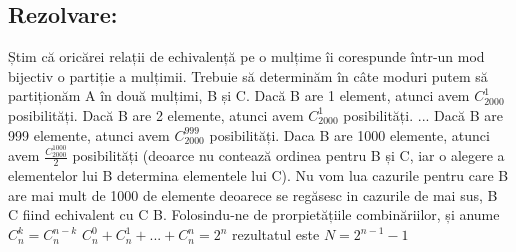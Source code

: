\documentclass{article}
\begin{document}
\subsection{Rezolvare:}
Știm că oricărei relații de echivalență pe o mulțime îi corespunde într-un mod bijectiv o partiție a mulțimii. Trebuie să determinăm în câte moduri putem să partiționăm A în două mulțimi, B și C.
\newline 
Dacă B are 1 element, atunci avem $C^1_{2000}$ posibilități.
\newline
Dacă B are 2 elemente, atunci avem $C^1_{2000}$ posibilități.
\newline
...
\newline
Dacă B are 999 elemente, atunci avem $C^{999}_{2000}$ posibilități.
\newline
Daca B are 1000 elemente, atunci avem $\frac{C^{1000}_{2000}}{2}$ posibilități (deoarce nu contează ordinea pentru B și C, iar o alegere a elementelor lui B determina elementele lui C).
\newline
Nu vom lua cazurile pentru care B are mai mult de 1000 de elemente deoarece se regăsesc in cazurile de mai sus, B C fiind echivalent cu C B.
\newline
Folosindu-ne de prorpietățiile combinăriilor, și anume
\newline
$C^k_n = C^{n - k}_n$
\newline
$C^0_n + C^1_n + ... + C^n_n = 2^n$
rezultatul este
\newline
$N = 2^{n-1} - 1$
\end{document}
